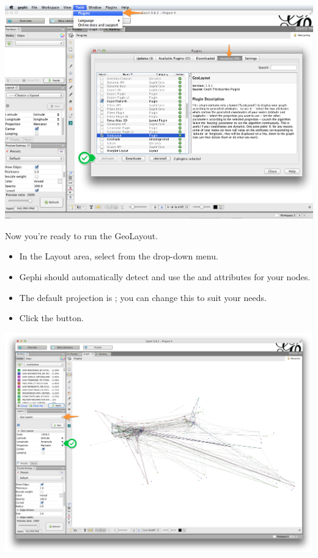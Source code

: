 \documentclass[letterpaper,10pt,english]{sphinxmanual}
\begin{document}
{\hfill\includegraphics{geo2.png}\hfill}

Now you're ready to run the GeoLayout.
\begin{itemize}
\item {} 
In the Layout area, select  from the drop-down menu.

\item {} 
Gephi should automatically detect and use the  and 
attributes for your nodes.

\item {} 
The default projection is ; you can change this to suit your needs.

\item {} 
Click the  button.

\end{itemize}

{\hfill\includegraphics{geo4.png}\hfill}
\end{document}
